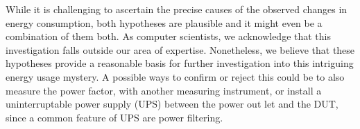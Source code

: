 While it is challenging to ascertain the precise causes of the observed changes in energy consumption, both hypotheses are plausible and it might even be a combination of them both. As computer scientists, we acknowledge that this investigation falls outside our area of expertise. Nonetheless, we believe that these hypotheses provide a reasonable basis for further investigation into this intriguing energy usage mystery. A possible ways to confirm or reject this could be to also measure the power factor, with another measuring instrument, or install a uninterruptable power supply (UPS) between the power out let and the DUT, since a common feature of UPS are power filtering.